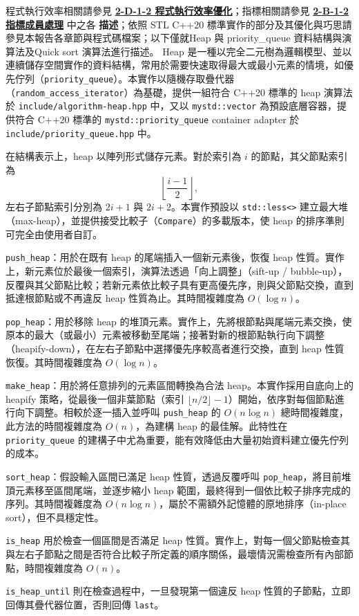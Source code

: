 \documentclass[a4paper,12pt]{article}
\begin{document}
\eit
{}
\label{2-D-1-1}
程式執⾏效率相關請參見 \hyperref[2-D-1-2]{\textbf{2-D-1-2 程式執⾏效率優化}}；指標相關請參見 \hyperref[2-B-1-2]{\textbf{2-B-1-2 指標成員處理}} 中之各 \textbf{描述}；依照 STL C++20 標準實作的部分及其優化與巧思請參見本報告各章節與程式碼檔案；以下僅就Heap 與 priority\_queue 資料結構與演算法及Quick sort 演算法進行描述。
Heap 是一種以完全二元樹為邏輯模型、並以連續儲存空間實作的資料結構，常用於需要快速取得最大或最小元素的情境，如優先佇列（\texttt{priority\_queue}）。本實作以隨機存取疊代器（\texttt{random\_access\_iterator}）為基礎，提供一組符合 C++20 標準的 heap 演算法於 \verb|include/algorithm-heap.hpp| 中，又以 \verb|mystd::vector| 為預設底層容器，提供符合 C++20 標準的 \texttt{mystd::priority\_queue} container adapter 於 \verb|include/priority_queue.hpp| 中。

在結構表示上，heap 以陣列形式儲存元素。對於索引為 $i$ 的節點，其父節點索引為
\[\left\lfloor \frac{i-1}{2} \right\rfloor,\]
左右子節點索引分別為 $2i+1$ 與 $2i+2$。本實作預設以 \texttt{std::less<>} 建立最大堆（max-heap），並提供接受比較子（\texttt{Compare}）的多載版本，使 heap 的排序準則可完全由使用者自訂。

\bit
\item\texttt{push\_heap}：用於在既有 heap 的尾端插入一個新元素後，恢復 heap 性質。實作上，新元素位於最後一個索引，演算法透過「向上調整」（sift-up / bubble-up），反覆與其父節點比較；若新元素依比較子具有更高優先序，則與父節點交換，直到抵達根節點或不再違反 heap 性質為止。其時間複雜度為 $O(\log n)$。
\item\texttt{pop\_heap}：用於移除 heap 的堆頂元素。實作上，先將根節點與尾端元素交換，使原本的最大（或最小）元素被移動至尾端；接著對新的根節點執行向下調整（heapify-down），在左右子節點中選擇優先序較高者進行交換，直到 heap 性質恢復。其時間複雜度為 $O(\log n)$。
\item\texttt{make\_heap}：用於將任意排列的元素區間轉換為合法 heap。本實作採用自底向上的 heapify 策略，從最後一個非葉節點（索引 $\lfloor n/2 \rfloor - 1$）開始，依序對每個節點進行向下調整。相較於逐一插入並呼叫 \texttt{push\_heap} 的 $O(n\log n)$ 總時間複雜度，此方法的時間複雜度為 $O(n)$，為建構 heap 的最佳解。此特性在 \texttt{priority\_queue} 的建構子中尤為重要，能有效降低由大量初始資料建立優先佇列的成本。
\item\texttt{sort\_heap}：假設輸入區間已滿足 heap 性質，透過反覆呼叫 \texttt{pop\_heap}，將目前堆頂元素移至區間尾端，並逐步縮小 heap 範圍，最終得到一個依比較子排序完成的序列。其時間複雜度為 $O(n \log n)$，屬於不需額外記憶體的原地排序（in-place sort），但不具穩定性。
\item\texttt{is\_heap} 用於檢查一個區間是否滿足 heap 性質。實作上，對每一個父節點檢查其與左右子節點之間是否符合比較子所定義的順序關係，最壞情況需檢查所有內部節點，時間複雜度為 $O(n)$。
\item\texttt{is\_heap\_until} 則在檢查過程中，一旦發現第一個違反 heap 性質的子節點，立即回傳其疊代器位置，否則回傳 \texttt{last}。
\eit
\end{document}
